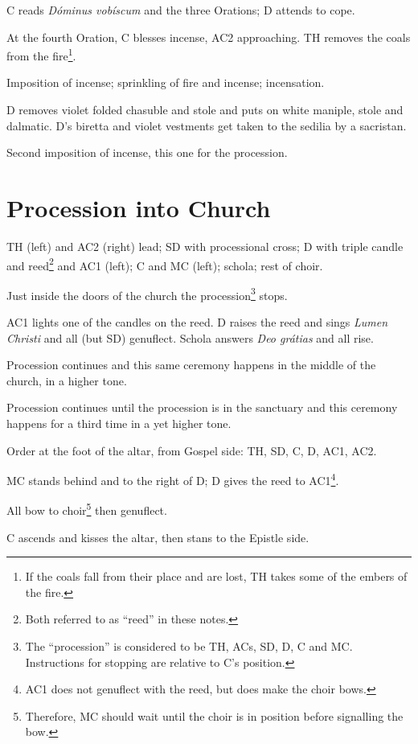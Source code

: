 {\rubric C reads \textit{Dóminus vobíscum} and the three Orations; D attends to
cope.

\rubric At the fourth Oration, C blesses incense, AC2 approaching. TH removes
the coals from the fire\footnote{If the coals fall from their place and are
lost, TH takes some of the embers of the fire.}.

\rubric Imposition of incense; sprinkling of fire and incense; incensation.

\rubric D removes violet folded chasuble and stole and puts on white maniple,
stole and dalmatic. D's biretta and violet vestments get taken to the sedilia
by a sacristan.

\rubric Second imposition of incense, this one for the procession.

\section{Procession into Church}

\rubric TH (left) and AC2 (right) lead; SD with processional cross; D with
triple candle and reed\footnote{Both referred to as ``reed'' in these notes.}
and AC1 (left); C and MC (left); schola; rest of choir.

\rubric Just inside the doors of the church the procession\footnote{The
``procession'' is considered to be TH, ACs, SD, D, C and MC. Instructions for
stopping are relative to C's position.} stops. 

\rubric AC1 lights one of the candles on the reed. D raises the reed and sings
\textit{Lumen Christi} and all (but SD) genuflect. Schola answers \textit{Deo
grátias} and all rise.

\rubric Procession continues and this same ceremony happens in the middle of
the church, in a higher tone.

\rubric Procession continues until the procession is in the sanctuary and this
ceremony happens for a third time in a yet higher tone.

\rubric Order at the foot of the altar, from Gospel side: TH, SD, C, D, AC1,
AC2.

\rubric MC stands behind and to the right of D; D gives the reed to
AC1\footnote{AC1 does not genuflect with the reed, but does make the choir
bows.}.

\rubric All bow to choir\footnote{Therefore, MC should wait until the choir is
in position before signalling the bow.} then genuflect.

\rubric C ascends and kisses the altar, then stans to the Epistle side.

}
